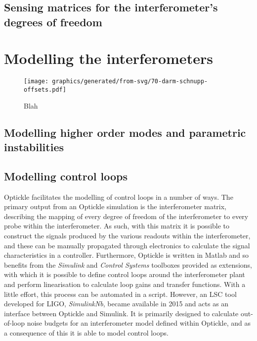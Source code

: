 \subsection{Sensing matrices for the interferometer's degrees of freedom}

\section{Modelling the \ET{} interferometers}

\begin{figure}
  \centering
  \texttt{[image: graphics/generated/from-svg/70-darm-schnupp-offsets.pdf]}
  \caption[Differential arm and Schnupp offsets in a \DRFPMI{}]{\label{fig:darm-schnupp-offsets}Blah}
\end{figure}

\subsection{Modelling higher order modes and parametric instabilities}

\subsection{Modelling control loops}
Optickle facilitates the modelling of control loops in a number of ways. The primary output from an Optickle simulation is the interferometer matrix, describing the mapping of every degree of freedom of the interferometer to every probe within the interferometer. As such, with this matrix it is possible to construct the signals produced by the various readouts within the interferometer, and these can be manually propagated through electronics to calculate the signal characteristics in a controller. Furthermore, Optickle is written in Matlab and so benefits from the \emph{Simulink} and \emph{Control Systems} toolboxes provided as extensions, with which it is possible to define control loops around the interferometer plant and perform linearisation to calculate loop gains and transfer functions. With a little effort, this process can be automated in a script. However, an \gls{LSC} tool developed for \gls{LIGO}, \emph{SimulinkNb}, became available in 2015 and acts as an interface between Optickle and Simulink. It is primarily designed to calculate out-of-loop noise budgets for an interferometer model defined within Optickle, and as a consequence of this it is able to model control loops.

